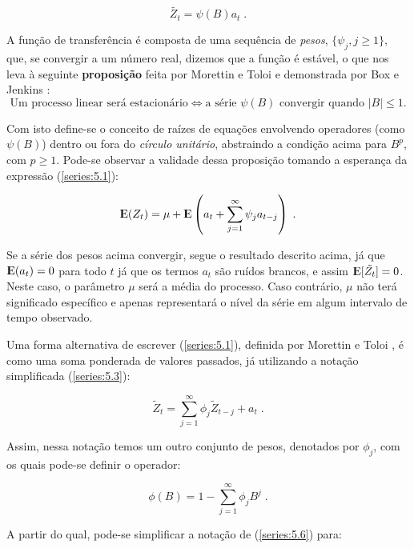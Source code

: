 \begin{equation}\label{series:5.3}
\tilde{Z_t} =  \psi(B)a_t\;.
\end{equation}

A função de transferência é composta de uma sequência de \emph{pesos}, $\{ \psi_j, j \geq 1 \}$, que, se convergir a um número real, dizemos que a função é estável, o que nos leva à seguinte \textbf{proposição} feita por Morettin e Toloi \citep{morettin} e demonstrada por Box e Jenkins \citep{box}:
\begin{equation}\label{prop:5.1}
\text{Um processo linear será estacionário} \Leftrightarrow \text{a série } \psi(B) \text{ convergir quando } |B| \leq 1.
\end{equation}

Com isto define-se o conceito de raízes de equações envolvendo operadores (como $\psi(B)$) dentro ou fora do \emph{círculo unitário}, abstraindo a condição acima para $B^p$, com $p \geq 1$. Pode-se observar a validade dessa proposição tomando a esperança da expressão (\ref{series:5.1}):

\[
{\rm I\kern-.3em E}(Z_t) = \mu + {\rm I\kern-.3em E} \left( a_t + \sum_{j=1}^\infty \psi_j a_{t-j} \right)\;.
\]

Se a série dos pesos acima convergir, segue o resultado descrito acima, já que ${\rm I\kern-.3em E}(a_t) = 0$ para todo $t$ já que os termos $a_t$ são ruídos brancos, e assim ${\rm I\kern-.3em E}[\tilde{Z_t}] = 0$. Neste caso, o parâmetro $\mu$ será a média do processo. Caso contrário, $\mu$ não terá significado específico e apenas representará o nível da série em algum intervalo de tempo observado.

Uma forma alternativa de escrever (\ref{series:5.1}), definida por Morettin e Toloi \citep{morettin}, é como uma soma ponderada de valores passados, já utilizando a notação simplificada (\ref{series:5.3}):

\begin{equation}\label{series:5.6}
\tilde{Z}_t = \sum_{j=1}^\infty \phi_j \tilde{Z}_{t-j} + a_t\;.
\end{equation}

Assim, nessa notação temos um outro conjunto de pesos, denotados por $\phi_j$, com os quais pode-se definir o operador:

\begin{equation}\label{series:5.8}
\phi(B) = 1 - \sum_{j=1}^\infty \phi_j B^j\;.
\end{equation}

A partir do qual, pode-se simplificar a notação de (\ref{series:5.6}) para:

